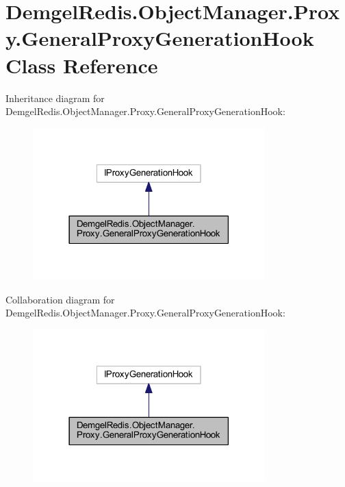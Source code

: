 \hypertarget{class_demgel_redis_1_1_object_manager_1_1_proxy_1_1_general_proxy_generation_hook}{}\section{Demgel\+Redis.\+Object\+Manager.\+Proxy.\+General\+Proxy\+Generation\+Hook Class Reference}
\label{class_demgel_redis_1_1_object_manager_1_1_proxy_1_1_general_proxy_generation_hook}


Inheritance diagram for Demgel\+Redis.\+Object\+Manager.\+Proxy.\+General\+Proxy\+Generation\+Hook\+:
\nopagebreak
\begin{figure}[H]
\begin{center}
\leavevmode
\includegraphics[width=254pt]{class_demgel_redis_1_1_object_manager_1_1_proxy_1_1_general_proxy_generation_hook__inherit__graph}
\end{center}
\end{figure}


Collaboration diagram for Demgel\+Redis.\+Object\+Manager.\+Proxy.\+General\+Proxy\+Generation\+Hook\+:
\nopagebreak
\begin{figure}[H]
\begin{center}
\leavevmode
\includegraphics[width=254pt]{class_demgel_redis_1_1_object_manager_1_1_proxy_1_1_general_proxy_generation_hook__coll__graph}
\end{center}
\end{figure}
